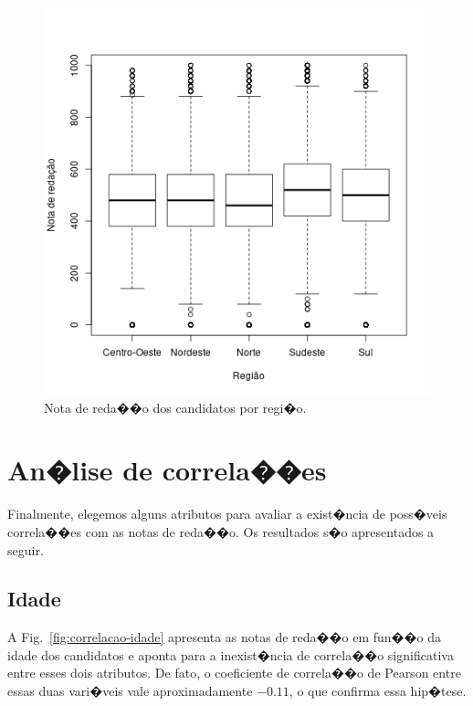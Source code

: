 \documentclass[12pt]{article}
\newcommand{\reffig}[1]{Fig.~\ref{fig:#1}}
\begin{document}
\begin{minipage}{.5\textwidth}
    \begin{figure}[H]
    \includegraphics[width=\linewidth]{../regiao_nota.png}
    \caption{Nota de reda��o dos candidatos por regi�o.}
    \label{fig:nota-por-regiao}
    \end{figure}
\end{minipage}

\section{An�lise de correla��es}
Finalmente, elegemos alguns atributos para avaliar a exist�ncia de poss�veis correla��es com as notas de reda��o.
Os resultados s�o apresentados a seguir.

\subsection{Idade}
A \reffig{correlacao-idade} apresenta as notas de reda��o em fun��o da idade dos candidatos e aponta para a inexist�ncia de correla��o significativa entre esses dois atributos.
De fato, o coeficiente de correla��o de Pearson entre essas duas vari�veis vale aproximadamente $-0.11$, o que confirma essa hip�tese.
\end{document}
